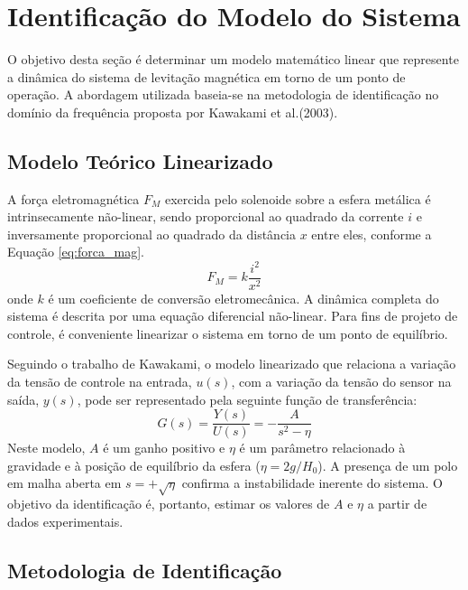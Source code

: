 \section{Identificação do Modelo do Sistema}

O objetivo desta seção é determinar um modelo matemático linear que represente a dinâmica do sistema de levitação magnética em torno de um ponto de operação. A abordagem utilizada baseia-se na metodologia de identificação no domínio da frequência proposta por Kawakami et al.(2003).

\subsection{Modelo Teórico Linearizado}

A força eletromagnética $F_M$ exercida pelo solenoide sobre a esfera metálica é intrinsecamente não-linear, sendo proporcional ao quadrado da corrente $i$ e inversamente proporcional ao quadrado da distância $x$ entre eles, conforme a Equação \ref{eq:forca_mag}.
\begin{equation}
    F_{M} = k \frac{i^{2}}{x^{2}}
    \label{eq:forca_mag}
\end{equation}
onde $k$ é um coeficiente de conversão eletromecânica. A dinâmica completa do sistema é descrita por uma equação diferencial não-linear. Para fins de projeto de controle, é conveniente linearizar o sistema em torno de um ponto de equilíbrio.

Seguindo o trabalho de Kawakami, o modelo linearizado que relaciona a variação da tensão de controle na entrada, $u(s)$, com a variação da tensão do sensor na saída, $y(s)$, pode ser representado pela seguinte função de transferência: 
\begin{equation}
    G(s) = \frac{Y(s)}{U(s)} = -\frac{A}{s^2 - \eta}
    \label{eq:tf_kawakami}
\end{equation}
Neste modelo, $A$ é um ganho positivo e $\eta$ é um parâmetro relacionado à gravidade e à posição de equilíbrio da esfera ($ \eta = 2g/H_0 $). A presença de um polo em malha aberta em $s = +\sqrt{\eta}$ confirma a instabilidade inerente do sistema. O objetivo da identificação é, portanto, estimar os valores de $A$ e $\eta$ a partir de dados experimentais.

\subsection{Metodologia de Identificação}

